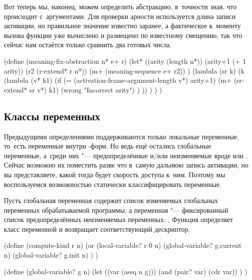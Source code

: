 Вот теперь мы, наконец, можем определить абстракцию, в~точности зная, что
происходит с~аргументами. Для проверки арности используется длина записи
активации, но правильное значение известно заранее, а фактическое к~моменту
вызова функции уже вычислено и размещено по известному смещению, так что сейчас
нам остаётся только сравнить два готовых числа.

\begin{code:lisp}
(define (meaning-fix-abstraction n* e+ r)
  (let* ((arity (length n*))
         (arity+1 (+ 1 arity))
         (r2 (r-extend* r n*))
         (m+ (meaning-sequence e+ r2)) )
    (lambda (sr k)
      (k (lambda (v* k1)
           (if (= (activation-frame-argument-length v*) arity+1)
               (m+ (sr-extend* sr v*) k1)
               (wrong "Incorrect arity") ) )) ) ) )
\end{code:lisp}


\subsection{Классы переменных}\label{fast/fast/ssest:classify}

Предыдущими определениями поддерживаются только локальные переменные, то~есть
переменные внутри -форм. Но ведь ещё остались глобальные переменные,
а~среди них "--- предопределённые \hbox{и/или} неизменяемые вроде  или
. Сейчас возможно их поместить разве что в~самую дальнюю запись
активации, но вы представляете, какой тогда будет скорость доступа к~ним.
Поэтому мы воспользуемся возможностью статически классифицировать переменные.

Пусть глобальная переменная  содержит список изменяемых глобальных
переменных обрабатываемой программы, а переменная  "--- фиксированный
список предопределённых неизменяемых переменных: ,  {\itd}
Функция  определяет класс переменной и возвращает
соответствующий дескриптор.

\begin{code:lisp}
(define (compute-kind r n)
  (or (local-variable? r 0 n)
      (global-variable? g.current n)
      (global-variable? g.init n) ) )

(define (global-variable? g n)
  (let ((var (assq n g)))
    (and (pair? var) (cdr var)) ) )
\end{code:lisp}

